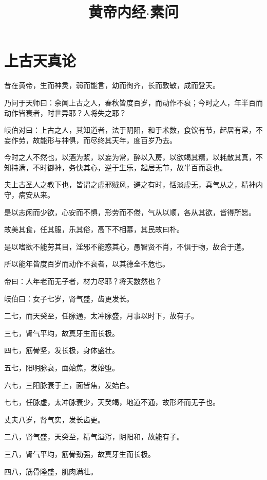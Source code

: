 \documentclass{article}%
\title{黄帝内经$\cdot$素问}
\date{}
\begin{document}
\maketitle
\tableofcontents
\clearpage

\section{上古天真论}

昔在黄帝，生而神灵，弱而能言，幼而徇齐，长而敦敏，成而登天。

乃问于天师曰：余闻上古之人，春秋皆度百岁，而动作不衰；今时之人，年半百而动作皆衰者，时世异耶？人将失之耶？

岐伯对曰：上古之人，其知道者，法于阴阳，和于术数，食饮有节，起居有常，不妄作劳，故能形与神俱，而尽终其天年，度百岁乃去。

今时之人不然也，以酒为浆，以妄为常，醉以入房，以欲竭其精，以耗散其真，不知持满，不时御神，务快其心，逆于生乐，起居无节，故半百而衰也。

夫上古圣人之教下也，皆谓之虚邪贼风，避之有时，恬淡虚无，真气从之，精神内守，病安从来。

是以志闲而少欲，心安而不惧，形劳而不倦，气从以顺，各从其欲，皆得所愿。

故美其食，任其服，乐其俗，高下不相慕，其民故曰朴。

是以嗜欲不能劳其目，淫邪不能惑其心，愚智贤不肖，不惧于物，故合于道。

所以能年皆度百岁而动作不衰者，以其德全不危也。

帝曰：人年老而无子者，材力尽耶？将天数然也？

岐伯曰：女子七岁，肾气盛，齿更发长。

二七，而天癸至，任脉通，太冲脉盛，月事以时下，故有子。

三七，肾气平均，故真牙生而长极。

四七，筋骨坚，发长极，身体盛壮。

五七，阳明脉衰，面始焦，发始堕。

六七，三阳脉衰于上，面皆焦，发始白。

七七，任脉虚，太冲脉衰少，天癸竭，地道不通，故形坏而无子也。

丈夫八岁，肾气实，发长齿更。

二八，肾气盛，天癸至，精气溢泻，阴阳和，故能有子。

三八，肾气平均，筋骨劲强，故真牙生而长极。

四八，筋骨隆盛，肌肉满壮。
\end{document}
